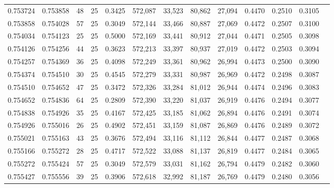 \begin{tabular}{rrrrrrrrrrrrr}
0.753724 & 0.753858 &    48 &  25 &                                     0.3425 & 572,087 &  33,523 &  80,862 &  27,094 & 0.4470 & 0.2510 & 0.3105 \\
0.753858 & 0.754028 &    57 &  25 &                                     0.3049 & 572,144 &  33,466 &  80,887 &  27,069 & 0.4472 & 0.2507 & 0.3100 \\
0.754034 & 0.754123 &    25 &  25 &                                     0.5000 & 572,169 &  33,441 &  80,912 &  27,044 & 0.4471 & 0.2505 & 0.3098 \\
0.754126 & 0.754256 &    44 &  25 &                                     0.3623 & 572,213 &  33,397 &  80,937 &  27,019 & 0.4472 & 0.2503 & 0.3094 \\
0.754257 & 0.754369 &    36 &  25 &                                     0.4098 & 572,249 &  33,361 &  80,962 &  26,994 & 0.4473 & 0.2500 & 0.3090 \\
0.754374 & 0.754510 &    30 &  25 &                                     0.4545 & 572,279 &  33,331 &  80,987 &  26,969 & 0.4472 & 0.2498 & 0.3087 \\
0.754510 & 0.754652 &    47 &  25 &                                     0.3472 & 572,326 &  33,284 &  81,012 &  26,944 & 0.4474 & 0.2496 & 0.3083 \\
0.754652 & 0.754836 &    64 &  25 &                                     0.2809 & 572,390 &  33,220 &  81,037 &  26,919 & 0.4476 & 0.2494 & 0.3077 \\
0.754838 & 0.754926 &    35 &  25 &                                     0.4167 & 572,425 &  33,185 &  81,062 &  26,894 & 0.4476 & 0.2491 & 0.3074 \\
0.754926 & 0.755016 &    26 &  25 &                                     0.4902 & 572,451 &  33,159 &  81,087 &  26,869 & 0.4476 & 0.2489 & 0.3072 \\
0.755021 & 0.755163 &    43 &  25 &                                     0.3676 & 572,494 &  33,116 &  81,112 &  26,844 & 0.4477 & 0.2487 & 0.3068 \\
0.755166 & 0.755272 &    28 &  25 &                                     0.4717 & 572,522 &  33,088 &  81,137 &  26,819 & 0.4477 & 0.2484 & 0.3065 \\
0.755272 & 0.755424 &    57 &  25 &                                     0.3049 & 572,579 &  33,031 &  81,162 &  26,794 & 0.4479 & 0.2482 & 0.3060 \\
0.755427 & 0.755556 &    39 &  25 &                                     0.3906 & 572,618 &  32,992 &  81,187 &  26,769 & 0.4479 & 0.2480 & 0.3056 \\

\end{tabular}
